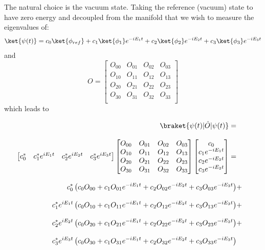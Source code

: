 The natural choice is the vacuum state.
Taking the reference (vacuum) state to have zero energy and decoupled from the manifold that we wish to measure the eigenvalues of:
\begin{equation*}
    \ket{\psi (t)} = c_0\ket{\phi_{ref}} + c_1\ket{\phi_1}e^{-i E_1 t} + c_2\ket{\phi_2}e^{-i E_2 t} + c_3\ket{\phi_3}e^{-i E_3 t}
\end{equation*}
and
\begin{equation*}
O =
\begin{bmatrix}
O_{00} & O_{01} & O_{02} & O_{03}\\
O_{10} & O_{11} & O_{12} & O_{13}\\
O_{20} & O_{21} & O_{22} & O_{23}\\
O_{30} & O_{31} & O_{32} & O_{33}\\
\end{bmatrix}
\end{equation*}
which leads to

\begin{equation*}
    \begin{aligned}
        \braket{\psi(t)|\hat{O}|\psi(t)} = \\[2.0ex]
        \begin{bmatrix}
            c_0^* & c_1^* e^{i E_1 t} & c_2^* e^{i E_2 t} & c_3^* e^{i E_3 t}
        \end{bmatrix}
        \begin{bmatrix}
            O_{00} & O_{01} & O_{02} & O_{03}\\
            O_{10} & O_{11} & O_{12} & O_{13}\\
            O_{20} & O_{21} & O_{22} & O_{23}\\
            O_{30} & O_{31} & O_{32} & O_{33}\\
        \end{bmatrix}
        \begin{bmatrix}
            c_0  \\
            c_1 e^{-i E_1 t} \\
            c_2 e^{-i E_2 t} \\
            c_3 e^{-i E_3 t}
        \end{bmatrix} = \\[2.0 ex]
        c_0^* \left( c_0 O_{00} + c_1 O_{01} e^{-i E_1 t} + c_2 O_{02} e^{-i E_2 t} + c_3 O_{03} e^{-i E_3 t} \right)& + \\[2.0 ex]
        c_1^* e^{i E_1 t} \left( c_0 O_{10} + c_1 O_{11} e^{-i E_1 t} + c_2 O_{12} e^{-i E_2 t} + c_3 O_{13} e^{-i E_3 t} \right)& +\\[2.0 ex]
        c_2^* e^{i E_2 t} \left( c_0 O_{20} + c_1 O_{21} e^{-i E_1 t} + c_2 O_{22} e^{-i E_2 t} + c_3 O_{23} e^{-i E_3 t} \right)& +\\[2.0 ex]
        c_3^* e^{i E_3 t} \left( c_0 O_{30} + c_1 O_{31} e^{-i E_1 t} + c_2 O_{32} e^{-i E_2 t} + c_3 O_{33} e^{-i E_3 t} \right)& \\[2.0 ex]
    \end{aligned}
\end{equation*}


